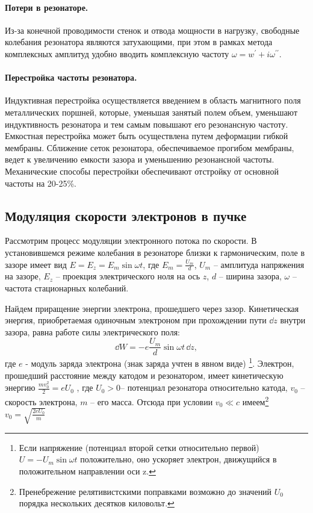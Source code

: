 \documentclass[a4paper,14pt]{extarticle}
\begin{document}
\paragraph{Потери в резонаторе.} Из-за конечной проводимости стенок и отвода мощности в нагрузку, свободные колебания резонатора являются затухающими, при этом в рамках метода комплексных амплитуд удобно вводить комплексную частоту $\omega = w^{\prime}+i\omega ^{\prime \prime}$.

\paragraph{Перестройка частоты резонатора.} Индуктивная перестройка осуществляется введением в область магнитного поля металлических поршней, кото­рые, уменьшая занятый полем объем, уменьшают индуктивность резонатора и тем самым повышают его резонансную частоту. Емкостная перестройка может быть осуществлена путем деформации гибкой мембраны. Сближение сеток резонатора, обеспечиваемое прогибом мембраны, ведет к увеличению емкости зазора и уменьшению резонансной частоты. Механические способы перестройки обеспечивают отстройку от основной частоты на 20-25\%.

\subsection{Модуляция скорости электронов в пучке}

Рассмотрим процесс модуляции электронного потока по скорости. В установившемся режиме колебания в резонаторе близки к гармоническим, поле в зазоре имеет вид 
$E = E _ { z } = E _ { m } \sin \omega t$, 
где $E _ { m } = \frac { U _ { m } } { d }$, $U _ { m }$ -- амплитуда напряжения на зазоре, $E _ { z }$ -- проекция электрического ноля на ось $z$,
$d$ -- ширина зазора, $\omega$ -- частота стационарных колебаний. 

Найдем приращение энергии электрона, прошедшего через зазор. Кинетическая энергия,
приобретаемая одиночным электроном при прохождении пути $\dd z$ внутри за­зора, равна работе силы электрического поля: 
\begin{equation}
    \dd W = - e \frac { U _ { m } } { d } \sin \omega t\, \dd z,
\end{equation} 
где $e$ - модуль заряда электрона (знак заряда учтен в явном виде)
\footnote{Если напряжение (потенциал второй сетки относительно первой) $U = -U_m \sin \omega t$ положительно, оно ускоряет электрон, движущийся в положительном направлении оси z.}. 
Электрон, прошедший расстояние между катодом и резонатором, имеет кинетическую энергию 
$\frac { m v _ { 0 } ^ { 2 } } { 2 } = e U _ { 0 }$ , где $U_0 > 0$-- потенциал резонатора относительно ка­тода, $v_0$ -- скорость электрона, $m$ -- его масса. Отсюда при условии $v _ { 0 } \ll c$ имеем\footnote{Пренебрежение релятивистскими поправками возможно до значений $U_0$ порядка нескольких
десятков киловольт.} 
$v _ { 0 } = \sqrt { \frac { 2 e U _ { 0 } } { m } }$
\end{document}
